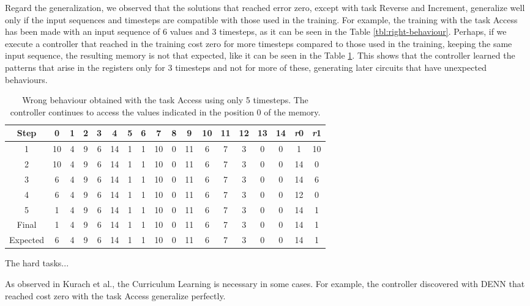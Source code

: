 Regard the generalization, we observed that the solutions that reached error zero, except with task Reverse and Increment, generalize well only if the input sequences and timesteps are compatible with those used in the training. For example, the training with the task Access has been made with an input sequence of 6 values and 3 timesteps, as it can be seen in the Table \ref{tbl:right-behaviour}. Perhaps, if we execute a controller that reached in the training cost zero for more timesteps compared to those used in the training, keeping the same input sequence, the resulting memory is not that expected, like it can be seen in the Table \ref{tbl:wrong-behaviour}. This shows that the controller learned the patterns that arise in the registers only for 3 timesteps and not for more of these, generating later circuits that have unexpected behaviours.\newline
\begin{table}[t]
	\centering
	\begin{tabular}{c|ccccccccccccccc|cc}
		\rowcolor{Gray}\textbf{Step} & 0 & 1 & 2 & 3 & 4 & 5 & 6 & 7 & 8 & 9 & 10 & 11 & 12 & 13 & 14 & \textit{r}0 & \textit{r}1 \\ \hline 
1 & 10 & 4 & 9 & 6 & 14 & 1 & 1 & 10 & 0 & 11 & 6 & 7 & 3 & 0 & 0 & 1 & 10 \\ 
2 & 10 & 4 & 9 & 6 & 14 & 1 & 1 & 10 & 0 & 11 & 6 & 7 & 3 & 0 & 0 & 14 & 0 \\ 
3 & 6 & 4 & 9 & 6 & 14 & 1 & 1 & 10 & 0 & 11 & 6 & 7 & 3 & 0 & 0 & 14 & 6 \\ 
4 & 6 & 4 & 9 & 6 & 14 & 1 & 1 & 10 & 0 & 11 & 6 & 7 & 3 & 0 & 0 & 12 & 0 \\ 
5 & 1 & 4 & 9 & 6 & 14 & 1 & 1 & 10 & 0 & 11 & 6 & 7 & 3 & 0 & 0 & 14 & 1 \\ \hline 
\rowcolor{Gray}Final & 1 & 4 & 9 & 6 & 14 & 1 & 1 & 10 & 0 & 11 & 6 & 7 & 3 & 0 & 0 & 14 & 1 \\
\rowcolor{Gray}Expected & 6 & 4 & 9 & 6 & 14 & 1 & 1 & 10 & 0 & 11 & 6 & 7 & 3 & 0 & 0 & 14 & 1 \\
	\end{tabular}
	\label{tbl:wrong-behaviour}
	\caption{Wrong behaviour obtained with the task Access using only 5 timesteps. The controller continues to access the values indicated in the position 0 of the memory.}
\end{table}
The hard tasks...\newline

As observed in Kurach et al., the Curriculum Learning is necessary in some cases. For example, the controller discovered with DENN that reached cost zero with the task Access generalize perfectly. 


